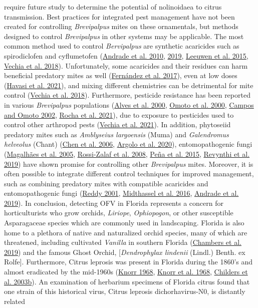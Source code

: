 \documentclass[12pt,final,CPage]{ufthesis}
\begin{document}
{require future study to determine the potential of nolinoidaea to citrus transmission. Best practices for integrated pest management have not been created for controlling \emph{Brevipalpus} mites on these ornamentals, but methods designed to control \emph{Brevipalpus} in other systems may be applicable. The most common method used to control \emph{Bervipalpus} are synthetic acaricides such as spirodiclofen and cyflumetofen (\protect\hyperlink{ref-Andrade2010}{Andrade et al. 2010}, \protect\hyperlink{ref-Andrade2019}{2019}, \protect\hyperlink{ref-Leeuwen2015}{Leeuwen et al. 2015}, \protect\hyperlink{ref-Vechia2018}{Vechia et al. 2018}). Unfortunately, some acaricides and their residues can harm beneficial predatory mites as well (\protect\hyperlink{ref-Fernandez2017}{Fernández et al. 2017}), even at low doses (\protect\hyperlink{ref-Havasi2021}{Havasi et al. 2021}), and mixing different chemistries can be detrimental for mite control (\protect\hyperlink{ref-Vechia2018}{Vechia et al. 2018}). Furthermore, pesticide resistance has been reported in various \emph{Brevipalpus} populations (\protect\hyperlink{ref-Alves2000}{Alves et al. 2000}, \protect\hyperlink{ref-Omoto2000}{Omoto et al. 2000}, \protect\hyperlink{ref-Campos2002}{Campos and Omoto 2002}, \protect\hyperlink{ref-Rocha2021}{Rocha et al. 2021}), due to exposure to pesticides used to control other arthropod pests (\protect\hyperlink{ref-Vechia2021}{Vechia et al. 2021}). In addition, phytoseiid predatory mites such as \emph{Amblyseius largoensis} (Muma) and \emph{Galendromus helveolus} (Chant) (\protect\hyperlink{ref-Chen2006}{Chen et al. 2006}, \protect\hyperlink{ref-Argolo2020}{Argolo et al. 2020}), entomopathogenic fungi (\protect\hyperlink{ref-Magalhaes2005}{Magalhães et al. 2005}, \protect\hyperlink{ref-RossiZalaf2008}{Rossi-Zalaf et al. 2008}, \protect\hyperlink{ref-Pena2015}{Peña et al. 2015}, \protect\hyperlink{ref-Revynthi2019}{Revynthi et al. 2019}) have shown promise for controlling other \emph{Brevipalpus} mites. Moreover, it is often possible to integrate different control techniques for improved management, such as combining predatory mites with compatible acaricides and entomopathogenic fungi (\protect\hyperlink{ref-Reddy2001}{Reddy 2001}, \protect\hyperlink{ref-Midthassel2016}{Midthassel et al. 2016}, \protect\hyperlink{ref-Andrade2019}{Andrade et al. 2019}). In conclusion, detecting OFV in Florida represents a concern for horticulturists who grow orchids, \emph{Liriope}, \emph{Ophiopogon}, or other susceptible Asparagaceae species which are commonly used in landscaping. Florida is also home to a plethora of native and naturalized orchid species, many of which are threatened, including cultivated \emph{Vanilla} in southern Florida (\protect\hyperlink{ref-Chambers2019}{Chambers et al. 2019}) and the famous Ghost Orchid, {[}\emph{Dendrophylax lindenii} (Lindl.) Benth. ex Rolfe{]}. Furthermore, Citrus leprosis was present in Florida during the 1860's and almost eradicated by the mid-1960s (\protect\hyperlink{ref-Knorr1968a}{Knorr 1968}, \protect\hyperlink{ref-Knorr1968b}{Knorr et al. 1968}, \protect\hyperlink{ref-Childers2003}{Childers et al. 2003b}). An examination of herbarium specimens of Florida citrus found that one strain of this historical virus, Citrus leprosis dichorhavirus-N0, is distantly related }
\end{document}
